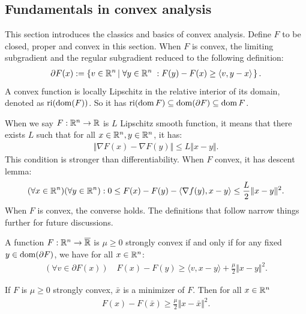 \documentclass[12pt]{article}
\begin{document}
    \subsection{Fundamentals in convex analysis}
        This section introduces the classics and basics of convex analysis. 
        Define $F$ to be closed, proper and convex in this section. 
        When $F$ is convex, the limiting subgradient and the regular subgradient reduced to the following definition:
        \begin{align*}
            \partial F(x) := \left\lbrace
                v \in \mathbb R^n \left|\; 
                    \forall y \in \mathbb R^n\; :  F(y) - F(x)  \ge \langle v, y - x\rangle
                \right.
            \right\rbrace. 
        \end{align*}
        A convex function is locally Lipschitz in the relative interior of its domain, denoted as $\operatorname{ri}(\operatorname{dom}(F))$. 
        So it has $\operatorname{ri}(\operatorname{dom} F)\subseteq \operatorname{dom}(\partial F) \subseteq \operatorname{dom} F$. 
        \par
        When we say $F:\mathbb R^n \rightarrow \mathbb R$ is $L$ Lipschitz smooth function, it means that there exists $L$ such that for all $x\in \mathbb R^n, y \in \mathbb R^n$, it has: 
        \begin{align*}
            \Vert \nabla F(x) - \nabla F(y)\Vert \le L \Vert x - y\Vert. 
        \end{align*}
        This condition is stronger than differentiability. 
        When $F$ convex, it has descent lemma: 
        \begin{align*}
            (\forall x \in \mathbb R^n)(\forall y \in \mathbb R^n): 0 \le 
            F(x) - F(y) - \langle \nabla f(y), x - y\rangle \le \frac{L}{2}\Vert x - y\Vert^2. 
        \end{align*}
        When $F$ is convex, the converse holds. 
        The definitions that follow narrow things further for future discussions. 
        \begin{definition}\label{def:s-cnvx}
            A function $F:\mathbb R^n \rightarrow \overline {\mathbb R}$ is $\mu \ge 0$ strongly convex if and only if for any fixed $y \in \operatorname{dom}(\partial F)$, we have for all $x\in \mathbb R^n$: 
            \begin{align*}
                (\forall v \in \partial F(x))\quad 
                F(x) - F(y) \ge \langle v, x - y\rangle + \frac{\mu}{2}\Vert x - y\Vert^2. 
            \end{align*}
        \end{definition}
        \begin{lemma}\label{lemma:q-growth}
            If $F$ is $\mu \ge 0$ strongly convex, $\bar x$ is a minimizer of $F$. 
            Then for all $x \in \mathbb R^n$
            \begin{align*}
                F(x) - F(\bar x) \ge \frac{\mu}{2}\Vert x - \bar x\Vert^2. 
            \end{align*}
        \end{lemma}
\end{document}
